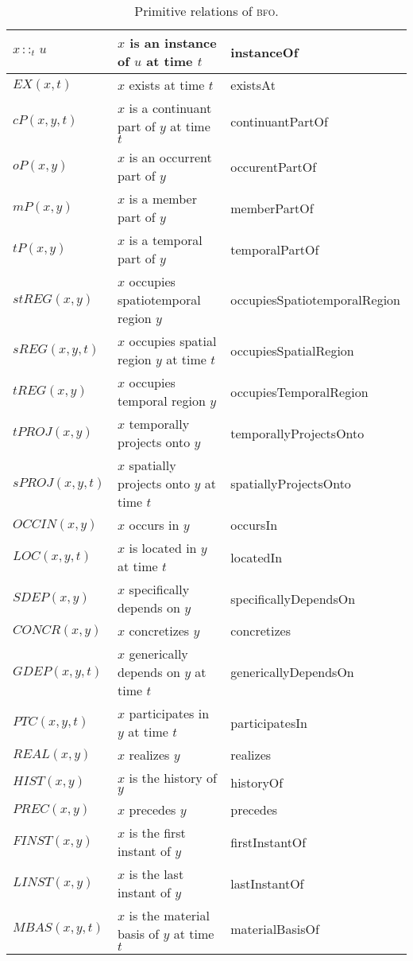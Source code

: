 \documentclass[ao]{iosart2x}
\newcommand{\prbfo}[1]{{\textit{{#1}}}}
\newcommand{\bfo}{{\textsc{bfo}}}
\newcommand{\bfocpart}{\prbfo{cP}}
\newcommand{\bfoopart}{\prbfo{oP}}
\newcommand{\bfotpart}{\prbfo{tP}}
\newcommand{\bfompart}{\prbfo{mP}}
\newcommand{\bfoexist}{\prbfo{EX}}
\newcommand{\bfoiof}[1]{{\,::_{#1\:\!}}}
\newcommand{\bfosdep}{\prbfo{SDEP}}
\newcommand{\bfogdep}{\prbfo{GDEP}}
\newcommand{\bfooccurs}{\prbfo{OCCIN}}
\newcommand{\bfolocated}{\prbfo{LOC}}
\newcommand{\bfosregof}{\prbfo{sREG}}
\newcommand{\bfotregof}{\prbfo{tREG}}
\newcommand{\bfostregof}{\prbfo{stREG}}
\newcommand{\bfoparticin}{\prbfo{PTC}}
\newcommand{\bfoconcr}{\prbfo{CONCR}}
\newcommand{\bforealizes}{\prbfo{REAL}}
\newcommand{\bfotproj}{\prbfo{tPROJ}}
\newcommand{\bfosproj}{\prbfo{sPROJ}}
\newcommand{\bfohistory}{\prbfo{HIST}}
\begin{document}
\begin{table*}
\caption{Primitive relations of {\bfo}.}\label{table_prim_bfo}
\begin{tabular}{|l|l|l|}
\hline
$x \bfoiof{t} u$ & $x$ is an instance of $u$ at time $t$ & instanceOf\\
\hline
$\bfoexist(x,t)$ & $x$ exists at time $t$ & existsAt\\
\hline
$\bfocpart(x,y,t)$ & $x$ is a continuant part of $y$ at time $t$ & continuantPartOf\\
\hline
$\bfoopart(x,y)$ & $x$ is an occurrent part of $y$ & occurentPartOf\\
\hline
$\bfompart(x,y)$ & $x$ is a member part of $y$ & memberPartOf\\
\hline
$\bfotpart(x,y)$ & $x$ is a temporal part of $y$ & temporalPartOf\\
\hline
$\bfostregof(x,y)$ & $x$ occupies spatiotemporal region $y$ & occupiesSpatiotemporalRegion\\
\hline
$\bfosregof(x,y,t)$ & $x$ occupies spatial region $y$ at time $t$ & occupiesSpatialRegion\\
\hline
$\bfotregof(x,y)$ & $x$ occupies temporal region $y$ & occupiesTemporalRegion\\
\hline
$\bfotproj(x,y)$ & $x$ temporally projects onto $y$ & temporallyProjectsOnto\\
\hline
$\bfosproj(x,y,t)$ & $x$ spatially projects onto $y$ at time $t$ & spatiallyProjectsOnto\\
\hline
$\bfooccurs(x,y)$ & $x$ occurs in $y$ & occursIn\\
\hline
$\bfolocated(x,y,t)$ & $x$ is located in $y$ at time $t$ & locatedIn\\
\hline
$\bfosdep(x,y)$ & $x$ specifically depends on $y$ & specificallyDependsOn\\
\hline
$\bfoconcr(x,y)$ & $x$ concretizes $y$ & concretizes\\
\hline
$\bfogdep(x,y,t)$ & $x$ generically depends on $y$ at time $t$ & genericallyDependsOn \\
\hline
$\bfoparticin(x,y,t)$ & $x$ participates in $y$ at time $t$ & participatesIn \\
\hline
$\bforealizes(x,y)$ & $x$ realizes $y$ & realizes\\
\hline
$\bfohistory(x,y)$ & $x$ is the history of $y$ & historyOf \\
\hline
$\prbfo{PREC}(x,y)$ & $x$ precedes $y$ & precedes\\
\hline
$\prbfo{FINST}(x,y)$ & $x$ is the first instant of $y$ & firstInstantOf\\
\hline
$\prbfo{LINST}(x,y)$ & $x$ is the last instant of $y$ & lastInstantOf\\
\hline
$\prbfo{MBAS}(x,y,t)$ & $x$ is the material basis of $y$ at time $t$ & materialBasisOf\\
\hline
\end{tabular}
\end{table*}
\end{document}

